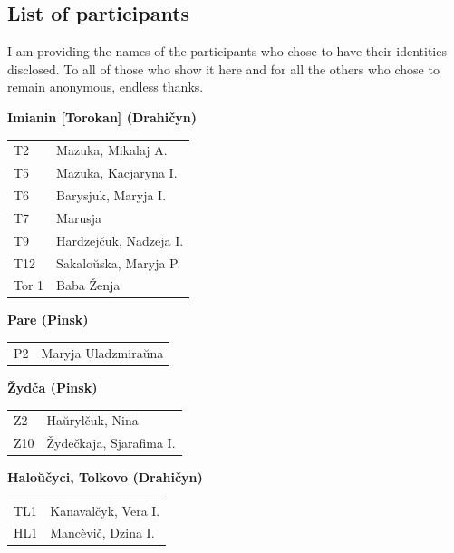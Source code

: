 \documentclass[output=paper,colorlinks,citecolor=brown]{langscibook}
\begin{document}
\begin{paperappendix}

\section{List of participants} \label{sec:roncero:app1}
I am providing the names of the participants who chose to have their identities disclosed. To all of those who show it here and for all the others who chose to remain anonymous, endless thanks.\vspace{10pt}

\noindent \textbf{Imianin [Torokan] (Drahičyn)}\\
\begin{tabularx}{.5\textwidth}{@{}lQ@{}}
T2 & Mazuka, Mikalaj A. \\
T5 & Mazuka, Kacjaryna I. \\
T6 & Barysjuk, Maryja I. \\
T7 & Marusja \\
T9 & Hardzejčuk, Nadzeja I. \\
T12 & Sakaloŭska, Maryja P. \\
Tor 1 & Baba Ženja \\
\end{tabularx}
\vspace{10pt}

\noindent \textbf{Pare (Pinsk)}\\
\begin{tabularx}{.5\textwidth}{@{}lQ@{}}
P2 & Maryja Uladzmiraŭna \\
\end{tabularx}
\vspace{10pt}

\noindent \textbf{Žydča (Pinsk)}\\
\begin{tabularx}{.5\textwidth}{@{}lQ@{}}
Z2 & Haŭrylčuk, Nina \\
Z10 & Žydečkaja, Sjarafima I. \\
\end{tabularx}
\vspace{10pt}

\noindent \textbf{Haloŭčyci, Tolkovo (Drahičyn)}\\
\begin{tabularx}{.5\textwidth}{@{}lQ@{}}
TL1 & Kanavalčyk, Vera I. \\
HL1 & Mancèvič, Dzina I. \\
\end{tabularx}

\end{paperappendix}
\sloppy
\printbibliography[heading=subbibliography,notkeyword=this]
\end{document}
